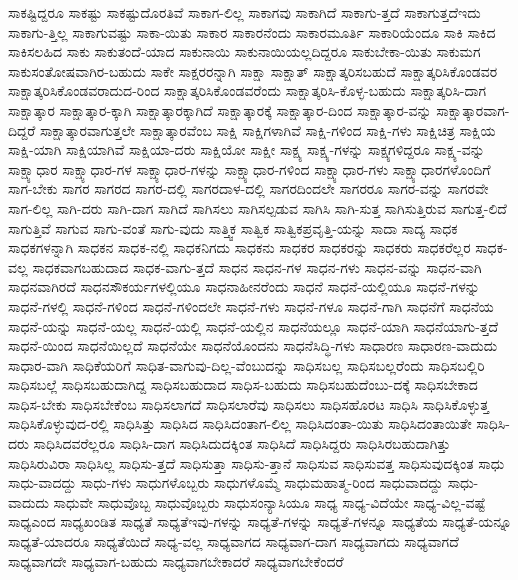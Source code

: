 {ಸಾಕಷ್ಟಿದ್ದರೂ
ಸಾಕಷ್ಟು
ಸಾಕಷ್ಟುದೊರತಿವೆ
ಸಾಕಾಗ-ಲಿಲ್ಲ
ಸಾಕಾಗವು
ಸಾಕಾಗಿದೆ
ಸಾಕಾಗು-ತ್ತದೆ
ಸಾಕಾಗುತ್ತದೆಇದು
ಸಾಕಾಗು-ತ್ತಿಲ್ಲ
ಸಾಕಾಗುವಷ್ಟು
ಸಾಕಾ-ಯಿತು
ಸಾಕಾರ
ಸಾಕಾರನೆಂದು
ಸಾಕಾರಮೂರ್ತಿ
ಸಾಕಾರಿಯೆಂದೂ
ಸಾಕಿ
ಸಾಕಿದ
ಸಾಕಿಸಲಹಿದ
ಸಾಕು
ಸಾಕುತಂದೆ-ಯಾದ
ಸಾಕುನಾಯಿ
ಸಾಕುನಾಯಿಯಲ್ಲದಿದ್ದರೂ
ಸಾಕುಬೇಕಾ-ಯಿತು
ಸಾಕುಮಗ
ಸಾಕುಸಂತೋಷವಾಗಿರ-ಬಹುದು
ಸಾಕೇ
ಸಾಕ್ಷರರನ್ನಾಗಿ
ಸಾಕ್ಷಾ
ಸಾಕ್ಷಾತ್
ಸಾಕ್ಷಾತ್ಕರಿಸಬಹುದೆ
ಸಾಕ್ಷಾತ್ಕರಿಸಿಕೊಂಡವರ
ಸಾಕ್ಷಾತ್ಕರಿಸಿಕೊಂಡವರಾದುದ-ರಿಂದ
ಸಾಕ್ಷಾತ್ಕರಿಸಿಕೊಂಡವರೆಂದು
ಸಾಕ್ಷಾತ್ಕರಿಸಿ-ಕೊಳ್ಳ-ಬಹುದು
ಸಾಕ್ಷಾತ್ಕರಿಸಿ-ದಾಗ
ಸಾಕ್ಷಾತ್ಕಾರ
ಸಾಕ್ಷಾತ್ಕಾರ-ಕ್ಕಾಗಿ
ಸಾಕ್ಷಾತ್ಕಾರಕ್ಕಾಗಿದೆ
ಸಾಕ್ಷಾತ್ಕಾರಕ್ಕೆ
ಸಾಕ್ಷಾತ್ಕಾರ-ದಿಂದ
ಸಾಕ್ಷಾತ್ಕಾರ-ವನ್ನು
ಸಾಕ್ಷಾತ್ಕಾರವಾಗ-ದಿದ್ದರೆ
ಸಾಕ್ಷಾತ್ಕಾರವಾಗುತ್ತಲೇ
ಸಾಕ್ಷಾತ್ಕಾರವೆಂಬ
ಸಾಕ್ಷಿ
ಸಾಕ್ಷಿಗಳಾಗಿವೆ
ಸಾಕ್ಷಿ-ಗಳಿಂದ
ಸಾಕ್ಷಿ-ಗಳು
ಸಾಕ್ಷಿಚಿತ್ರ
ಸಾಕ್ಷಿಯ
ಸಾಕ್ಷಿ-ಯಾಗಿ
ಸಾಕ್ಷಿಯಾಗಿವೆ
ಸಾಕ್ಷಿಯಾ-ದರು
ಸಾಕ್ಷಿಯೋ
ಸಾಕ್ಷೀ
ಸಾಕ್ಷ್ಯ
ಸಾಕ್ಷ್ಯ-ಗಳನ್ನು
ಸಾಕ್ಷ್ಯಗಳಿದ್ದರೂ
ಸಾಕ್ಷ್ಯ-ವನ್ನು
ಸಾಕ್ಷ್ಯಾಧಾರ
ಸಾಕ್ಷ್ಯಾಧಾರ-ಗಳ
ಸಾಕ್ಷ್ಯಾಧಾರ-ಗಳನ್ನು
ಸಾಕ್ಷ್ಯಾಧಾರ-ಗಳಿಂದ
ಸಾಕ್ಷ್ಯಾಧಾರ-ಗಳು
ಸಾಕ್ಷ್ಯಾಧಾರಗಳೊಂದಿಗೆ
ಸಾಗ-ಬೇಕು
ಸಾಗರ
ಸಾಗರದ
ಸಾಗರ-ದಲ್ಲಿ
ಸಾಗರದಾಳ-ದಲ್ಲಿ
ಸಾಗರದಿಂದಲೇ
ಸಾಗರರೂ
ಸಾಗರ-ವನ್ನು
ಸಾಗರವೇ
ಸಾಗ-ಲಿಲ್ಲ
ಸಾಗಿ-ದರು
ಸಾಗಿ-ದಾಗ
ಸಾಗಿದೆ
ಸಾಗಿಸಲು
ಸಾಗಿಸಲ್ಪಡುವ
ಸಾಗಿಸಿ
ಸಾಗಿ-ಸುತ್ತ
ಸಾಗಿಸುತ್ತಿರುವ
ಸಾಗುತ್ತ-ಲಿದೆ
ಸಾಗುತ್ತಿವೆ
ಸಾಗುವ
ಸಾಗು-ವಂತೆ
ಸಾಗು-ವುದು
ಸಾತ್ತ್ವಿಕ
ಸಾತ್ವಿಕ
ಸಾತ್ವಿಕಪ್ರವೃತ್ತಿ-ಯನ್ನು
ಸಾದಾ
ಸಾದ್ಯ
ಸಾಧಕ
ಸಾಧಕಗಳನ್ನಾಗಿ
ಸಾಧಕನ
ಸಾಧಕ-ನಲ್ಲಿ
ಸಾಧಕನಿಗದು
ಸಾಧಕನು
ಸಾಧಕರ
ಸಾಧಕರನ್ನು
ಸಾಧಕರು
ಸಾಧಕರೆಲ್ಲರ
ಸಾಧಕ-ವಲ್ಲ
ಸಾಧಕವಾಗಬಹುದಾದ
ಸಾಧಕ-ವಾಗು-ತ್ತದೆ
ಸಾಧನ
ಸಾಧನ-ಗಳ
ಸಾಧನ-ಗಳು
ಸಾಧನ-ವನ್ನು
ಸಾಧನ-ವಾಗಿ
ಸಾಧನವಾಗಿರದೆ
ಸಾಧನಸೌಕರ್ಯಗಳಲ್ಲಿಯೂ
ಸಾಧನಾಹೀನರೆಂದು
ಸಾಧನೆ
ಸಾಧನೆ-ಯಲ್ಲಿಯೂ
ಸಾಧನೆ-ಗಳನ್ನು
ಸಾಧನೆ-ಗಳಲ್ಲಿ
ಸಾಧನೆ-ಗಳಿಂದ
ಸಾಧನೆ-ಗಳಿಂದಲೇ
ಸಾಧನೆ-ಗಳು
ಸಾಧನೆ-ಗಳೂ
ಸಾಧನೆ-ಗಾಗಿ
ಸಾಧನೆಗೆ
ಸಾಧನೆಯ
ಸಾಧನೆ-ಯನ್ನು
ಸಾಧನೆ-ಯಲ್ಲ
ಸಾಧನೆ-ಯಲ್ಲಿ
ಸಾಧನೆ-ಯಲ್ಲಿನ
ಸಾಧನೆಯಲ್ಲೂ
ಸಾಧನೆ-ಯಾಗಿ
ಸಾಧನೆಯಾಗು-ತ್ತದೆ
ಸಾಧನೆ-ಯಿಂದ
ಸಾಧನೆಯಿಲ್ಲದೆ
ಸಾಧನೆಯೇ
ಸಾಧನೆಯೊಂದನು
ಸಾಧನೆಸಿದ್ಧಿ-ಗಳು
ಸಾಧಾರಣ
ಸಾಧಾರಣ-ವಾದುದು
ಸಾಧಾರ-ವಾಗಿ
ಸಾಧಿಕೆಯರಿಗೆ
ಸಾಧಿತ-ವಾಗುವು-ದಿಲ್ಲ-ವೆಂಬುದನ್ನು
ಸಾಧಿಸಬಲ್ಲ
ಸಾಧಿಸಬಲ್ಲರೆಂದು
ಸಾಧಿಸಬಲ್ಲಿರಿ
ಸಾಧಿಸಬಲ್ಲೆ
ಸಾಧಿಸಬಹುದಾಗಿದ್ದ
ಸಾಧಿಸಬಹುದಾದ
ಸಾಧಿಸ-ಬಹುದು
ಸಾಧಿಸಬಹುದೆಂಬು-ದಕ್ಕೆ
ಸಾಧಿಸಬೇಕಾದ
ಸಾಧಿಸ-ಬೇಕು
ಸಾಧಿಸಬೇಕೆಂಬ
ಸಾಧಿಸಲಾಗದೆ
ಸಾಧಿಸಲಾರೆವು
ಸಾಧಿಸಲು
ಸಾಧಿಸಹೊರಟ
ಸಾಧಿಸಿ
ಸಾಧಿಸಿಕೊಳ್ಳುತ್ತ
ಸಾಧಿಸಿಕೊಳ್ಳುವುದ-ರಲ್ಲಿ
ಸಾಧಿಸಿತ್ತು
ಸಾಧಿಸಿದ
ಸಾಧಿಸಿದಂತಾಗ-ಲಿಲ್ಲ
ಸಾಧಿಸಿದಂತಾ-ಯಿತು
ಸಾಧಿಸಿದಂತಾಯಿತೇ
ಸಾಧಿಸಿ-ದರು
ಸಾಧಿಸಿದವರೆಲ್ಲರೂ
ಸಾಧಿಸಿ-ದಾಗ
ಸಾಧಿಸಿದುದಕ್ಕಿಂತ
ಸಾಧಿಸಿದೆ
ಸಾಧಿಸಿದ್ದರು
ಸಾಧಿಸಿರಬಹುದಾಗಿತ್ತು
ಸಾಧಿಸಿರುವಿರಾ
ಸಾಧಿಸಿಲ್ಲ
ಸಾಧಿಸು-ತ್ತದೆ
ಸಾಧಿಸುತ್ತಾ
ಸಾಧಿಸು-ತ್ತಾನೆ
ಸಾಧಿಸುವ
ಸಾಧಿಸುವತ್ತ
ಸಾಧಿಸುವುದಕ್ಕಿಂತ
ಸಾಧು
ಸಾಧು-ವಾದದ್ದು
ಸಾಧು-ಗಳು
ಸಾಧುಗಳೊಬ್ಬರು
ಸಾಧುಗಳೊಮ್ಮೆ
ಸಾಧುಮಹಾತ್ಮ-ರಿಂದ
ಸಾಧುವಾದದ್ದು
ಸಾಧು-ವಾದುದು
ಸಾಧುವೇ
ಸಾಧುವೊಬ್ಬ
ಸಾಧುವೊಬ್ಬರು
ಸಾಧುಸಂನ್ಯಾಸಿಯೂ
ಸಾಧ್ಯ
ಸಾಧ್ಯ-ವಿದೆಯೇ
ಸಾಧ್ಯ-ವಿಲ್ಲ-ವಷ್ಟೆ
ಸಾಧ್ಯಎಂದ
ಸಾಧ್ಯಖಂಡಿತ
ಸಾಧ್ಯತೆ
ಸಾಧ್ಯತೆಇವು-ಗಳನ್ನು
ಸಾಧ್ಯತೆ-ಗಳನ್ನು
ಸಾಧ್ಯತೆ-ಗಳನ್ನೂ
ಸಾಧ್ಯತೆಯ
ಸಾಧ್ಯತೆ-ಯನ್ನೂ
ಸಾಧ್ಯತೆ-ಯಾದರೂ
ಸಾಧ್ಯತೆಯಿದೆ
ಸಾಧ್ಯ-ವಲ್ಲ
ಸಾಧ್ಯವಾಗದ
ಸಾಧ್ಯವಾಗ-ದಾಗ
ಸಾಧ್ಯವಾಗದು
ಸಾಧ್ಯವಾಗದೆ
ಸಾಧ್ಯವಾಗದೇ
ಸಾಧ್ಯವಾಗ-ಬಹುದು
ಸಾಧ್ಯವಾಗಬೇಕಾದರೆ
ಸಾಧ್ಯವಾಗಬೇಕೆಂದರೆ
}
